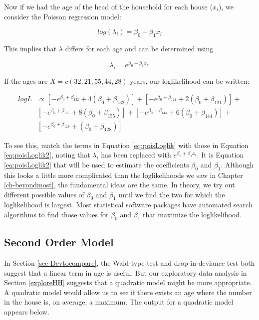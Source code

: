 \documentclass[
]{krantz}
\begin{document}
Now if we had the age of the head of the household for each house (\(x_i\)), we consider the Poisson regression model:

\[log(\lambda_i)=\beta_0+\beta_1x_i \]

This implies that \(\lambda\) differs for each age and can be determined using

\[\lambda_i=e^{\beta_0+\beta_1x_i.}\]

If the ages are \(X=c(32,21,55,44,28)\) years, our loglikelihood can be written:

\begin{align}
 logL & \propto [-e^{\beta_0+\beta_132}+4({\beta_0+\beta_132})]+
[-e^{\beta_0+\beta_121}+2({\beta_0+\beta_121})]+ \nonumber \\ 
&  [-e^{\beta_0+\beta_155}+8({\beta_0+\beta_155})]+
[-e^{\beta_0+\beta_144}+6({\beta_0+\beta_144})]+ \nonumber \\
  &  [-e^{\beta_0+\beta_128}+({\beta_0+\beta_128})]
\label{eq:poisLoglik2}
\end{align}

To see this, match the terms in Equation \eqref{eq:poisLoglik} with those in Equation \eqref{eq:poisLoglik2}, noting that \(\lambda_i\) has been replaced with \(e^{\beta_0+\beta_1x_i}\). It is Equation \eqref{eq:poisLoglik2} that will be used to estimate the coefficients \(\beta_0\) and \(\beta_1\). Although this looks a little more complicated than the loglikelihoods we saw in Chapter \ref{ch-beyondmost}, the fundamental ideas are the same. In theory, we try out different possible values of \(\beta_0\) and \(\beta_1\) until we find the two for which the loglikelihood is largest. Most statistical software packages have automated search algorithms to find those values for \(\beta_0\) and \(\beta_1\) that maximize the loglikelihood.

\hypertarget{second-order-model}{%
\subsection{Second Order Model}\label{second-order-model}}

In Section \ref{sec-Devtocompare}, the Wald-type test and drop-in-deviance test both suggest that a linear term in age is useful. But our exploratory data analysis in Section \ref{exploreHH} suggests that a quadratic model might be more appropriate. A quadratic model would allow us to see if there exists an age where the number in the house is, on average, a maximum. The output for a quadratic model appears below.
\end{document}
